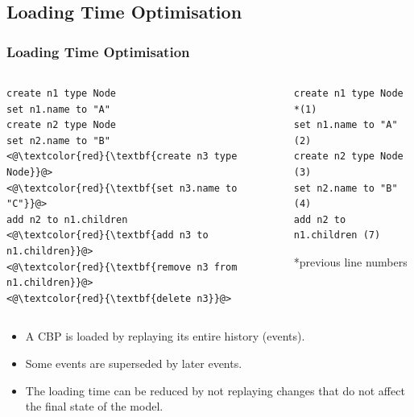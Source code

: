 \documentclass{beamer}
\begin{document}
\begin{frame}[fragile]
\section{Loading Time Optimisation}
\frametitle{Loading Time Optimisation}

\begin{columns}
\begin{column}[t]{0.5\linewidth}
\begin{lstlisting}[style=eol,caption={A tree model persisted in change-based.},label=lst:cbpmodel]
create n1 type Node
set n1.name to "A"  
create n2 type Node
set n2.name to "B"  
<@\textcolor{red}{\textbf{create n3 type Node}}@> 
<@\textcolor{red}{\textbf{set n3.name to "C"}}@>   
add n2 to n1.children   
<@\textcolor{red}{\textbf{add n3 to n1.children}}@> 
<@\textcolor{red}{\textbf{remove n3 from n1.children}}@> 
<@\textcolor{red}{\textbf{delete n3}}@> 
\end{lstlisting}        
\end{column}

\begin{column}[t]{0.5\linewidth}
\begin{lstlisting}[style=eol,caption={The CBP after optimisation.},label=lst:cbpmodel_optimised]
create n1 type Node  *(1)
set n1.name to "A"    (2)
create n2 type Node   (3)
set n2.name to "B"    (4)
add n2 to n1.children (7)
\end{lstlisting}
*previous line numbers\\
\end{column}
\end{columns}
\begin{itemize}
    \item A CBP is loaded by replaying its entire history (events).
    \item Some events are superseded by later events.
    \item The loading time can be reduced by not replaying changes that do not affect the final state of the model.
\end{itemize}
\end{frame}
\end{document}

